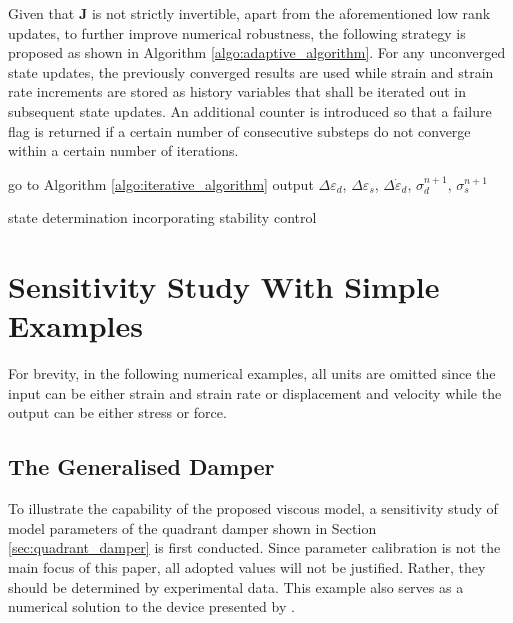 Given that $\mathbold{J}$ is not strictly invertible, apart from the aforementioned low rank updates, to further improve numerical robustness, the following strategy is proposed as shown in Algorithm \ref{algo:adaptive_algorithm}. For any unconverged state updates, the previously converged results are used while strain and strain rate increments are stored as history variables that shall be iterated out in subsequent state updates. An additional counter is introduced so that a failure flag is returned if a certain number of consecutive substeps do not converge within a certain number of iterations.
\begin{algorithm}[htb]\onehalfspacing
{}
go to Algorithm \ref{algo:iterative_algorithm}\;
output $\Delta\varepsilon_d$, $\Delta\varepsilon_s$, $\Delta\dot\varepsilon_d$, $\sigma^{n+1}_d$, $\sigma^{n+1}_s$\;
\caption{state determination incorporating stability control}\label{algo:adaptive_algorithm}
\end{algorithm}
\section{Sensitivity Study With Simple Examples}
For brevity, in the following numerical examples, all units are omitted since the input can be either strain and strain rate or displacement and velocity while the output can be either stress or force.
\subsection{The Generalised Damper}
To illustrate the capability of the proposed viscous model, a sensitivity study of model parameters of the quadrant damper shown in Section \ref{sec:quadrant_damper} is first conducted. Since parameter calibration is not the main focus of this paper, all adopted values will not be justified. Rather, they should be determined by experimental data. This example also serves as a numerical solution to the device presented by \citet{Hazaveh2017}.
